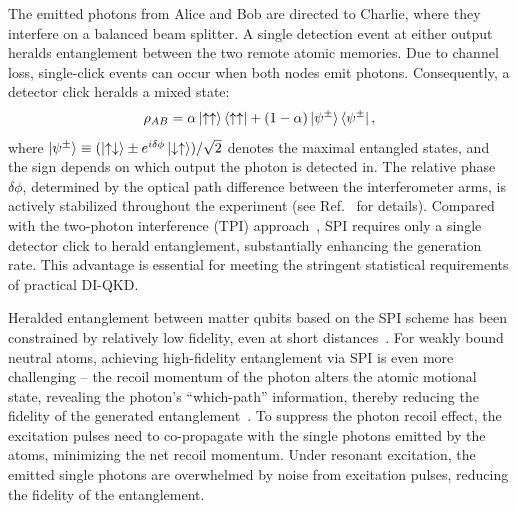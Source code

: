\documentclass[aps,reprint,showpacs,superscriptaddress]{revtex4-2}
\begin{document}
The emitted photons from Alice and Bob are directed to Charlie, where they interfere on a balanced beam splitter. A single detection event at either output heralds entanglement between the two remote atomic memories. Due to channel loss, single-click events can occur when both nodes emit photons. Consequently, a detector click heralds a mixed state:
\begin{equation}
	\rho_{AB}
	= \alpha\ket{\uparrow\uparrow}\bra{\uparrow\uparrow}+(1-\alpha)\ket{\psi^{\pm}}\bra{\psi^{\pm}},
	\label{eq:memory-memory-entanglement}
\end{equation}
where $\ket{\psi^{\pm}} \equiv (\ket{\uparrow\downarrow}\pm e^{i\delta\phi}\ket{\downarrow\uparrow})/\sqrt{2}$ denotes the maximal entangled states, and the sign depends on which output the photon is detected in. The relative phase $\delta\phi$, determined by the optical path difference between the interferometer arms, is actively stabilized throughout the experiment (see Ref.~\cite{SM} for details). Compared with the two-photon interference (TPI) approach~\cite{van2022entangling,krutyanskiy2023entanglement}, SPI requires only a single detector click to herald entanglement, substantially enhancing the generation rate. This advantage is essential for meeting the stringent statistical requirements of practical DI-QKD.

Heralded entanglement between matter qubits based on the SPI scheme has been constrained by relatively low fidelity, even at short distances~\cite{ruskuc2025multiplexed,humphreys2018deterministic,yang2025entangling}. For weakly bound neutral atoms, achieving high-fidelity entanglement via SPI is even more challenging -- the recoil momentum of the photon alters the atomic motional state, revealing the photon's ``which-path'' information, thereby reducing the fidelity of the generated entanglement~\cite{slodivcka2013atom}. To suppress the photon recoil effect, the excitation pulses need to co-propagate with the single photons emitted by the atoms, minimizing the net recoil momentum. Under resonant excitation, the emitted single photons are overwhelmed by noise from excitation pulses, reducing the fidelity of the entanglement.
\end{document}
